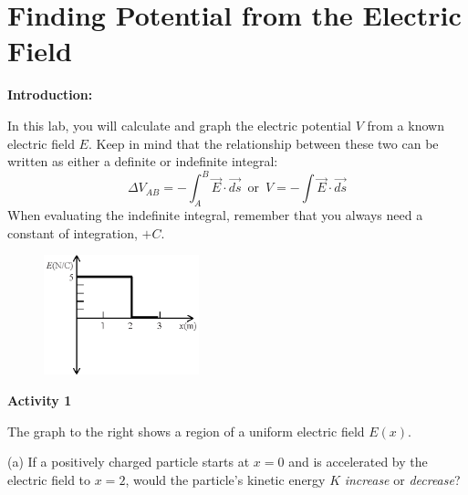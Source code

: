 
\section{Finding Potential from the Electric Field}

\makelabheader %

\vspace{0.4in}
\textbf{Introduction:}

In this lab, you will calculate and graph the electric potential $V$ from a known electric field $E$.  Keep in mind that the relationship between these two can be written as either a definite or indefinite integral:
\begin{displaymath}
\Delta V_{AB} = -\int_A^B{\vec{E} \cdot \vec{ds}} \, \textrm{ or } \,
V =-\int{\vec{E} \cdot \vec{ds}} 
\end{displaymath}
When evaluating the indefinite integral, remember that you always need a constant of integration, $+C$.  
\vspace{0.4in}

\begin{figure}
    \includegraphics[width=0.4\textwidth]{finding_v_from_e/fig1.eps}
\end{figure}

\textbf{Activity 1} 

The graph to the right shows a region of a uniform electric field $E(x)$.  

(a) If a positively charged particle starts at $x=0$ and is accelerated by the electric field to $x=2$, would the particle's kinetic energy $K$ \textit{increase} or \textit{decrease}?
\answerspace{0.7in}

